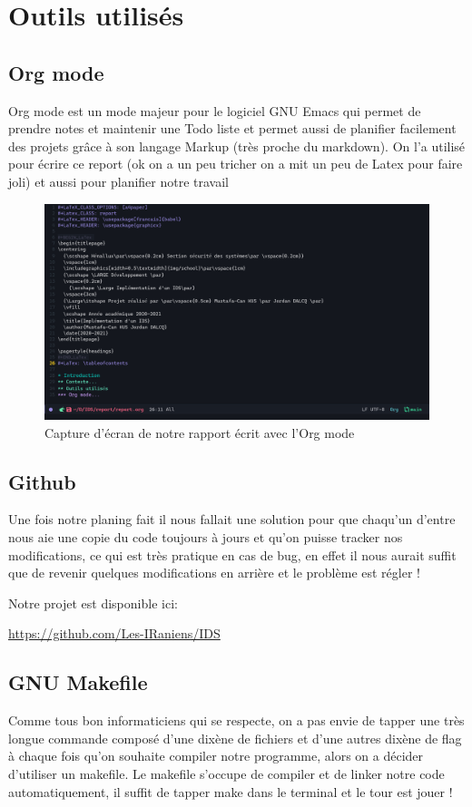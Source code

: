 \documentclass[a4paper]{report}
\begin{document}
\chapter{Outils utilisés}
\label{sec:org8e3225b}
\section{Org mode}
\label{sec:org0e1ee43}
Org mode est un mode majeur pour le logiciel GNU Emacs qui permet de prendre notes et maintenir une Todo liste et permet aussi de planifier facilement des projets
grâce à son langage Markup (très proche du markdown). On l'a utilisé pour écrire ce report (ok on a un peu tricher on a mit un peu de Latex pour faire joli) et aussi
pour planifier notre travail 

\begin{figure}[htbp]
\centering
\includegraphics[width=.9\linewidth]{./img/org.png}
\caption{\label{fig:org498c5f6}Capture d'écran de notre rapport écrit avec l'Org mode}
\end{figure}
\section{Github}
\label{sec:orga820e72}
Une fois notre planing fait il nous fallait une solution pour que chaqu'un d'entre nous aie une copie du code toujours à jours 
et qu'on puisse tracker nos modifications, ce qui est très pratique en cas de bug, en effet il nous aurait suffit que de revenir 
quelques modifications en arrière et le problème est régler !

Notre projet est disponible ici:
\begin{LaTex}
\begin{center}
    {\small \url{https://github.com/Les-IRaniens/IDS}}
\end{center}
\end{LaTex}
\section{GNU Makefile}
\label{sec:orgd4f8571}
Comme tous bon informaticiens qui se respecte, on a pas envie de tapper une très longue commande composé d'une dixène de fichiers et d'une
autres dixène de flag à chaque fois qu'on souhaite compiler notre programme, alors on a décider d'utiliser un makefile. 
Le makefile s'occupe de compiler et de linker notre code automatiquement, il suffit de tapper make dans le terminal et le tour est jouer !
\end{document}
